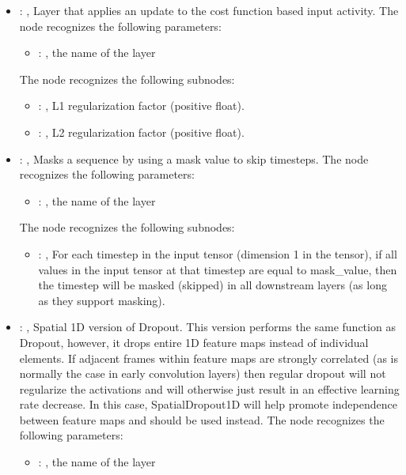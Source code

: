 \begin{itemize}
    \item {}: , 
      Layer that applies an update to the cost function based input activity.
      The  node recognizes the following parameters:
        \begin{itemize}
          \item {}: , 
            the name of the layer
      \end{itemize}

      The  node recognizes the following subnodes:
      \begin{itemize}
        \item {}: , 
          L1 regularization factor (positive float).

        \item {}: , 
          L2 regularization factor (positive float).
      \end{itemize}

    \item {}: , 
      Masks a sequence by using a mask value to skip timesteps.
      The  node recognizes the following parameters:
        \begin{itemize}
          \item {}: , 
            the name of the layer
      \end{itemize}

      The  node recognizes the following subnodes:
      \begin{itemize}
        \item {}: , 
          For each timestep in the input tensor (dimension 1 in the tensor), if all values in the
          input         tensor at that timestep are equal to mask\_value, then the timestep will be
          masked (skipped) in all         downstream layers (as long as they support masking).
      \end{itemize}

    \item {}: , 
      Spatial 1D version of Dropout. This version performs the same function as Dropout, however,
      it drops entire 1D feature maps instead of individual elements. If adjacent frames within
      feature         maps are strongly correlated (as is normally the case in early convolution
      layers) then regular         dropout will not regularize the activations and will otherwise
      just result in an effective learning         rate decrease. In this case, SpatialDropout1D
      will help promote independence between feature         maps and should be used instead.
      The  node recognizes the following parameters:
        \begin{itemize}
          \item {}: , 
            the name of the layer
      \end{itemize}


\end{itemize}

